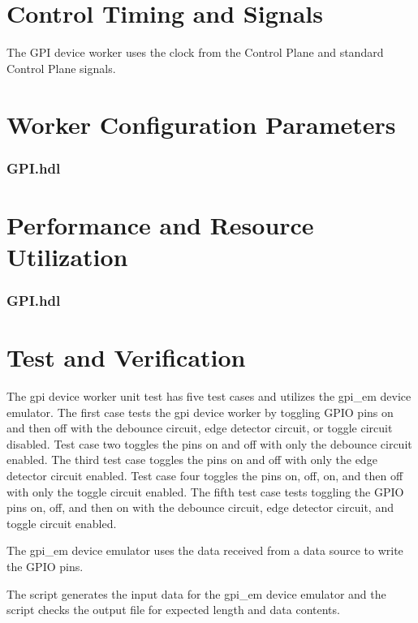 \documentclass{article}
\def\comp{GPI}
\begin{document}
\section*{Control Timing and Signals}
\begin{flushleft}

The GPI device worker uses the clock from the Control Plane and standard Control Plane signals.

\end{flushleft}

\begin{landscape}
\section*{Worker Configuration Parameters}
\subsubsection*{\comp.hdl}

\section*{Performance and Resource Utilization}
\subsubsection*{\comp.hdl}

\end{landscape}



\section*{Test and Verification}
\normalsize

\begin{flushleft}

The gpi device worker unit test has five test cases and utilizes the gpi\_em device emulator. The first case tests the gpi device worker by toggling GPIO pins on and then off with the debounce circuit, edge detector circuit, or toggle circuit disabled. Test case two toggles the pins on and off with only the debounce circuit enabled. The third test case toggles the pins on and off with only the edge detector circuit enabled. Test case four toggles the pins on, off, on, and then off with only the toggle circuit enabled. The fifth test case tests toggling the GPIO pins on, off, and then on with the debounce circuit, edge detector circuit, and toggle circuit enabled. \newline

The gpi\_em device emulator uses the data received from a data source to write the GPIO pins. \newline

The  script generates the input data for the gpi\_em device emulator and the  script checks the output file for expected length and
data contents.

\end{flushleft}
\end{document}
